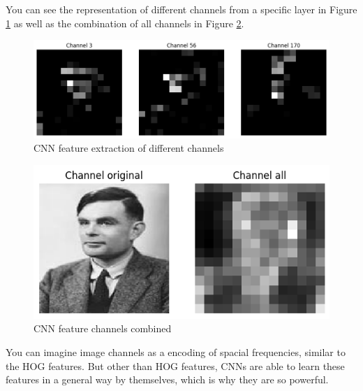 You can see the representation of different channels from a specific layer in Figure \ref{fig:cnn-features} as well as the combination of all channels in Figure \ref{fig:cnn-features-1}.

\begin{figure}[h]
  \centering
  \includegraphics[width=.95\textwidth]{images/cnn-0.png}
  \caption{CNN feature extraction of different channels}
  \label{fig:cnn-features}
\end{figure}

\begin{figure}[h]
  \centering
  \includegraphics[width=.95\textwidth]{images/cnn-1.png}
  \caption{CNN feature channels combined}
  \label{fig:cnn-features-1}
\end{figure}

You can imagine image channels as a encoding of spacial frequencies, similar to the HOG features.
But other than HOG features, CNNs are able to learn these features in a general way by themselves, which is why they are so powerful.

